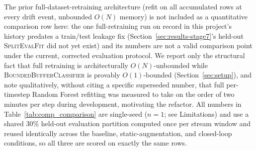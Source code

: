 \documentclass[conference]{IEEEtran}
\begin{document}
\begin{table}[!t]
\centering
\caption{\textsc{BoundedBufferClassifier} adaptation characteristics under closed-loop evaluation}
\label{tab:comp_comparison}
\end{table}

The prior full-dataset-retraining architecture (refit on all accumulated rows at every drift
event, unbounded $O(N)$ memory) is not included as a quantitative comparison row here: the one
full-retraining run on record in this project's history predates a train/test leakage fix
(Section~\ref{sec:results-stage7}'s held-out \textsc{SplitEvalFit} did not yet exist) and its
numbers are not a valid comparison point under the current, corrected evaluation protocol. We
report only the structural fact that full retraining is architecturally $O(N)$-unbounded while
\textsc{BoundedBufferClassifier} is provably $O(1)$-bounded (Section~\ref{sec:setup}), and note
qualitatively, without citing a specific superseded number, that full per-timestep Random Forest
refitting was measured to take on the order of two minutes per step during development, motivating
the refactor. All numbers in Table~\ref{tab:comp_comparison} are single-seed ($n=1$; see
Limitations) and use a shared 30\% held-out evaluation partition computed once per stream window
and reused identically across the baseline, static-augmentation, and closed-loop conditions, so all
three are scored on exactly the same rows.
\end{document}
